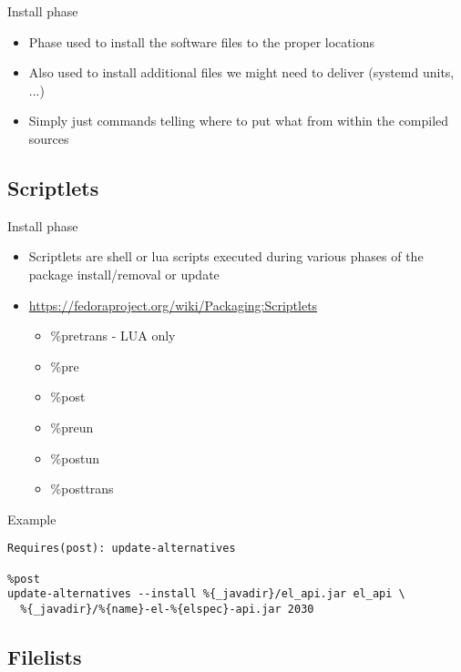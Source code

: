 \documentclass{beamer}
\begin{document}
\begin{frame}[t]{Install phase}
	\begin{itemize}
	\item Phase used to install the software files to the proper locations
    \item Also used to install additional files we might need to deliver (systemd units, ...)
    \item Simply just commands telling where to put what from within the compiled sources
	\end{itemize}
\end{frame}

\subsection{Scriptlets}

\begin{frame}[t]{Install phase}
	\begin{itemize}
    \item Scriptlets are shell or lua scripts executed during various phases of the package install/removal or update
    \item \url{https://fedoraproject.org/wiki/Packaging:Scriptlets}
        \begin{itemize}
        \item \%pretrans - LUA only
        \item \%pre
        \item \%post
        \item \%preun
        \item \%postun
        \item \%posttrans
        \end{itemize}
	\end{itemize}
\end{frame}

\begin{frame}[fragile]{Example}
	\begin{small}
	\begin{verbatim}
Requires(post): update-alternatives

%post
update-alternatives --install %{_javadir}/el_api.jar el_api \
  %{_javadir}/%{name}-el-%{elspec}-api.jar 2030
	\end{verbatim}
	\end{small}
\end{frame}

\subsection{Filelists}
\end{document}
